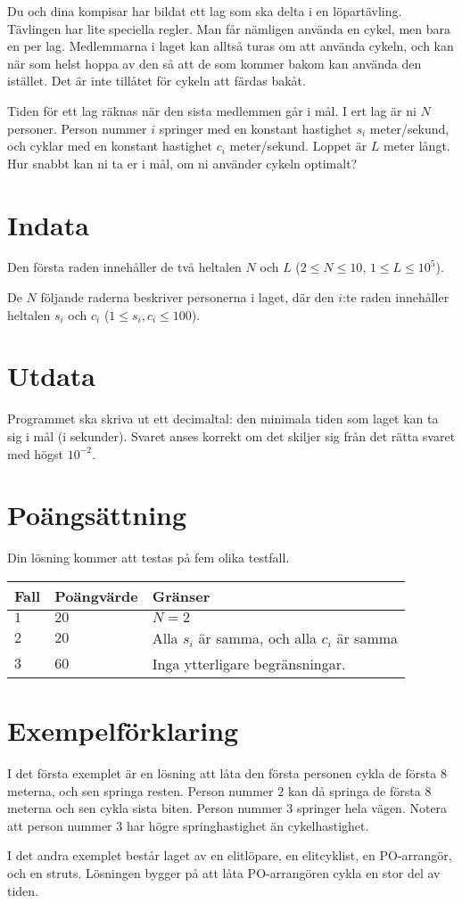 Du och dina kompisar har bildat ett lag som ska delta i en löpartävling. Tävlingen har lite speciella regler.
Man får nämligen använda en cykel, men bara en per lag. Medlemmarna i laget kan alltså turas om att använda cykeln, och kan
när som helst hoppa av den så att de som kommer bakom kan använda den istället. Det är inte tillåtet för cykeln att färdas bakåt. 

Tiden för ett lag räknas när den sista medlemmen går i mål. I ert lag är ni $N$ personer. Person nummer $i$ springer med en 
konstant hastighet $s_i$ meter/sekund, och cyklar med en konstant hastighet $c_i$ meter/sekund. Loppet är $L$ meter långt.
Hur snabbt kan ni ta er i mål, om ni använder cykeln optimalt?

\section*{Indata}
Den första raden innehåller de två heltalen $N$ och $L$ ($2 \leq N \leq 10$, $1 \leq L \leq 10^5$).

De $N$ följande raderna beskriver personerna i laget, där den $i$:te raden innehåller heltalen $s_i$ och $c_i$ ($1 \leq s_i, c_i \leq 100$).

\section*{Utdata}
Programmet ska skriva ut ett decimaltal: den minimala tiden som laget kan ta sig i mål (i sekunder).
Svaret anses korrekt om det skiljer sig från det rätta svaret med högst $10^{-2}$.

\section*{Poängsättning}
Din lösning kommer att testas på fem olika testfall.

\noindent
\begin{tabular}{| l | l | l |}
  \hline
  Fall & Poängvärde & Gränser \\ \hline
  $1$    & $20$        &  $N = 2$ \\ \hline 
  $2$    & $20$        &  Alla $s_i$ är samma, och alla $c_i$ är samma \\ \hline 
  $3$    & $60$        &  Inga ytterligare begränsningar. \\ \hline
\end{tabular}

\section*{Exempelförklaring}
I det första exemplet är en lösning att låta den första personen cykla de första $8$ meterna, och sen springa resten. Person nummer $2$
kan då springa de första $8$ meterna och sen cykla sista biten. Person nummer $3$ springer hela vägen. Notera att person nummer $3$ har
högre springhastighet än cykelhastighet.

I det andra exemplet består laget av en elitlöpare, en elitcyklist, en PO-arrangör, och en struts. Lösningen bygger på att låta PO-arrangören
cykla en stor del av tiden.
